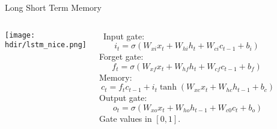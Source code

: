 \documentclass[xcolor=table]{beamer}
\newcommand{\hdir}{.}
\begin{document}
\begin{frame}{Long Short Term Memory}

	\begin{columns}[c]
	
 
		\vspace{-0.3cm}
			\hspace*{-0.5cm}
	   	 	\texttt{[image: \\hdir/lstm\_nice.png]}

	 	 	
		
		\ Input gate: 
		\vspace{-0.3cm}
		\begin{equation}
		\nonumber
			i_t = \sigma(W_{xi} x_t + W_{hi} h_t + W_{ci} c_{t-1} + b_i)
	 	\end{equation}
	 	\vspace{-0.1cm}
	 	Forget gate:
	 	\vspace{-0.3cm}
	 	\begin{equation}
	 	\nonumber
			f_t = \sigma(W_{xf} x_t + W_{hf} h_t + W_{cf} c_{t-1} + b_f)
	 	\end{equation}
	 	\vspace{-0.1cm}
	 	Memory:
	 	\vspace{-0.3cm}
	 	\begin{equation}
	 	 \nonumber
			\ c_t = f_t c_{t-1} + i_t \tanh(W_{xc} x_t + W_{hc} h_{t-1} + b_c)
	 	\end{equation}
	 	\vspace{-0.1cm}
	 	Output gate:
	 	\vspace{-0.3cm}
	 	\begin{equation}
	 	\nonumber
			\ o_t = \sigma(W_{xo} x_t + W_{ho} h_{t-1} + W_{c0} c_{t} + b_o)
	 	\end{equation}
	 	\vspace{-0.2cm}
	 	Gate values in $[0,1]$.
	

\end{columns}
\end{frame}
\end{document}
